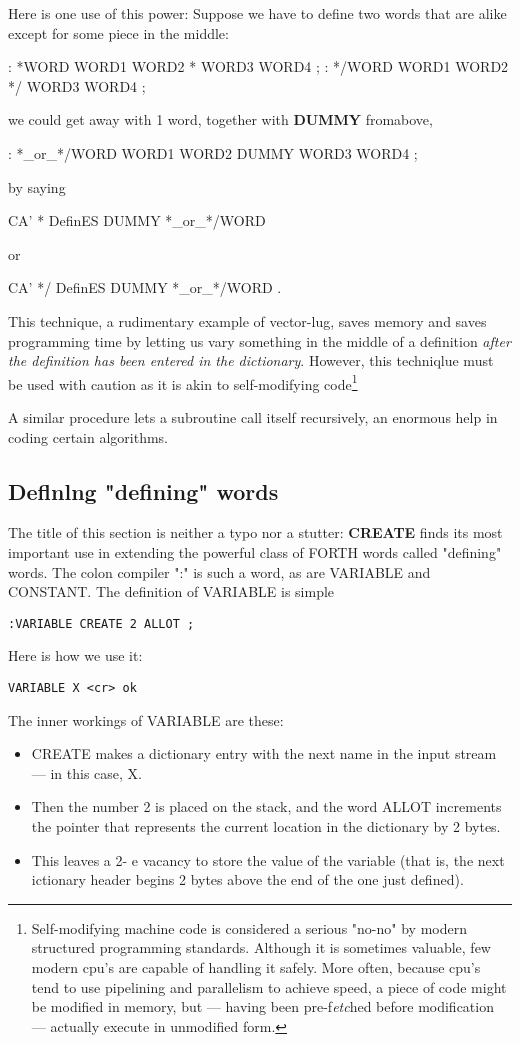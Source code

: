 Here is one use of this power: Suppose we have to define two words that are alike except for some piece in the middle:

: *WORD  WORD1 WORD2 * WORD3 WORD4 ;
: */WORD WORD1 WORD2 */ WORD3 WORD4 ;

we could get away with 1 word, together with \textbf{DUMMY} fromabove,

: *\_or\_*/WORD
	WORD1 WORD2
	DUMMY
	WORD3 WORD4 ;
	
by saying

CA' * DefinES DUMMY *\_or\_*/WORD

or

CA' */ DefinES DUMMY *\_or\_*/WORD .

This technique, a rudimentary example of vector-lug, saves memory and saves programming time by letting us vary something in the middle of a definition \textit{after the definition has been entered in the dictionary}. However, this techniqlue must be used with caution as it is akin to self-modifying code\footnote{Self-modifying machine code is considered a serious "no-no" by modern structured programming standards. Although it is sometimes valuable, few modern cpu's are capable of handling it safely. More often, because cpu's tend to use pipelining and parallelism to achieve speed, a piece of code might be modified in memory, but — having been pre-f\textit{etc}hed before modification — actually execute in unmodified form.}


A similar procedure lets a subroutine call itself recursively, an enormous help in coding certain algorithms.

\subsection{Deﬂnlng "defining" words}

The title of this section is neither a typo nor a stutter: \textbf{CREATE} finds its most important use in extending the powerful class of FORTH words called "defining" words. The colon compiler ":" is such a word, as are VARIABLE and CONSTANT. The definition of VARIABLE is simple

\begin{verbatim}
:VARIABLE CREATE 2 ALLOT ;
\end{verbatim}

Here is how we use it:
\begin{verbatim}
VARIABLE X <cr> ok
\end{verbatim}

The inner workings of VARIABLE are these:
\begin{itemize}
    \item CREATE makes a dictionary entry with the next name in the input stream — in this case, X.
    \item Then the number 2 is placed on the stack, and the word ALLOT
increments the pointer that represents the current location in the dictionary by 2 bytes.
    \item This leaves a 2- e vacancy to store the value of the variable (that is, the next ictionary header begins 2 bytes above the end of the one just defined).
\end{itemize}

